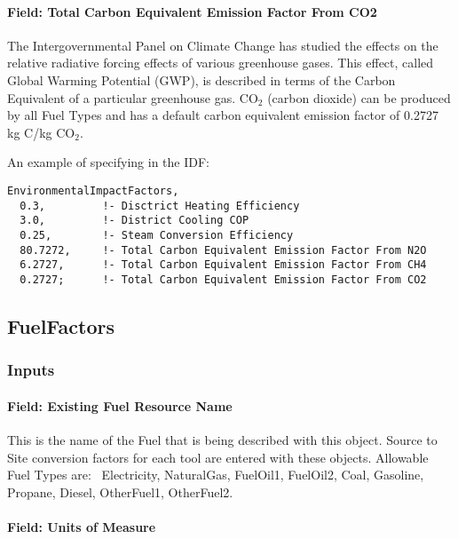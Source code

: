 \paragraph{Field: Total Carbon Equivalent Emission Factor From CO2}\label{field-total-carbon-equivalent-emission-factor-from-co2}

The Intergovernmental Panel on Climate Change has studied the effects on the relative radiative forcing effects of various greenhouse gases. This effect, called Global Warming Potential (GWP), is described in terms of the Carbon Equivalent of a particular greenhouse gas. CO\(_{2}\) (carbon dioxide) can be produced by all Fuel Types and has a default carbon equivalent emission factor of 0.2727 kg C/kg CO\(_{2}\).

An example of specifying in the IDF:

\begin{lstlisting}
EnvironmentalImpactFactors,
  0.3,         !- Disctrict Heating Efficiency
  3.0,         !- District Cooling COP
  0.25,        !- Steam Conversion Efficiency
  80.7272,     !- Total Carbon Equivalent Emission Factor From N2O
  6.2727,      !- Total Carbon Equivalent Emission Factor From CH4
  0.2727;      !- Total Carbon Equivalent Emission Factor From CO2
\end{lstlisting}

\subsection{FuelFactors}\label{fuelfactors}

\subsubsection{Inputs}\label{inputs-11-015}

\paragraph{Field: Existing Fuel Resource Name}\label{field-existing-fuel-resource-name}

This is the name of the Fuel that is being described with this object. Source to Site conversion factors for each tool are entered with these objects. Allowable Fuel Types are:~ Electricity, NaturalGas, FuelOil1, FuelOil2, Coal, Gasoline, Propane, Diesel, OtherFuel1, OtherFuel2.

\paragraph{Field: Units of Measure}\label{field-units-of-measure}

